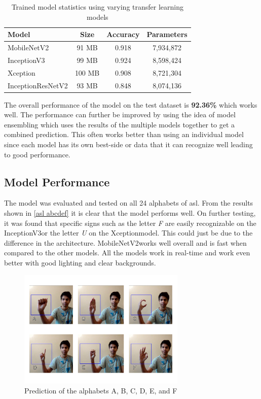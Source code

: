 \documentclass[twocolumn]{article}
\newcommand{\mobilenet}{MobileNetV2}
\newcommand{\xception}{Xception}
\newcommand{\inception}{InceptionV3}
\newcommand{\resnet}{InceptionResNetV2}
\begin{document}
\begin{table}[h]
\begin{tabular}{ |l|c|c|c| }
  \hline
  \textbf{Model} & \textbf{Size} & \textbf{Accuracy} & \textbf{Parameters} \\ \hline
  \mobilenet & 91 MB & 0.918 & 7,934,872 \\ \hline
  \inception & 99 MB & 0.924 & 8,598,424 \\ \hline
  \xception & 100 MB & 0.908 & 8,721,304 \\ \hline
  \resnet & 93 MB & 0.848 & 8,074,136 \\
  \hline
\end{tabular}
\caption{Trained model statistics using varying transfer learning models}
\end{table}

The overall performance of the model on the test dataset is \textbf{92.36\%} 
which works well. The performance can further be improved by using the idea of 
model ensembling which uses the results of the multiple models together to get 
a combined prediction. This often works better than using an individual model 
since each model has its own best-side or data that it can recognize well 
leading to good performance.

\subsection{Model Performance}

The model was evaluated and tested on all 24 alphabets of \gls{asl}. From the 
results shown in \autoref{asl abcdef} it is clear that the model performs 
well. On further testing, it was found that specific signs such as the letter 
\textit{F} are easily recognizable on the \inception or the letter \textit{U} 
on the \xception model. This could just be due to the difference in the 
architecture. \mobilenet works well overall and is fast when compared to the 
other models. All the models work in real-time and work even better with good 
lighting and clear backgrounds.

\begin{figure}[h]
\centering
\includegraphics[width=8cm]{./figures/asl abcdef}
\caption{Prediction of the alphabets A, B, C, D, E, and F}
\label{asl abcdef}
\end{figure}
\end{document}
